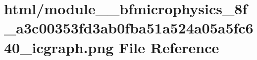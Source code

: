 \hypertarget{module____bfmicrophysics__8f__a3c00353fd3ab0fba51a524a05a5fc640__icgraph_8png}{}\section{html/module\+\_\+\+\_\+bfmicrophysics\+\_\+8f\+\_\+a3c00353fd3ab0fba51a524a05a5fc640\+\_\+icgraph.png File Reference}
\label{module____bfmicrophysics__8f__a3c00353fd3ab0fba51a524a05a5fc640__icgraph_8png}

